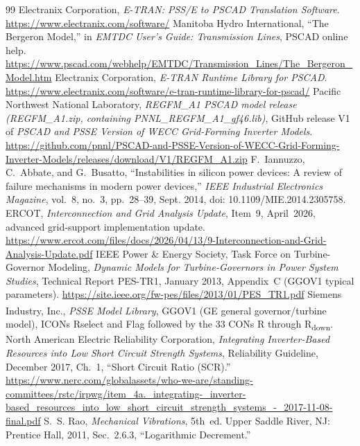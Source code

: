 \documentclass[11pt]{article}
\begin{document}
\begin{thebibliography}{99}
 Electranix Corporation, \emph{E-TRAN: PSS/E to PSCAD Translation Software}. \url{https://www.electranix.com/software/}
 Manitoba Hydro International, ``The Bergeron Model,'' in \emph{EMTDC User's Guide: Transmission Lines}, PSCAD online help. \url{https://www.pscad.com/webhelp/EMTDC/Transmission_Lines/The_Bergeron_Model.htm}
 Electranix Corporation, \emph{E-TRAN Runtime Library for PSCAD}. \url{https://www.electranix.com/software/e-tran-runtime-library-for-pscad/}
 Pacific Northwest National Laboratory, \emph{REGFM\_A1 PSCAD model release (REGFM\_A1.zip, containing PNNL\_REGFM\_A1\_gf46.lib)}, GitHub release V1 of \emph{PSCAD and PSSE Version of WECC Grid-Forming Inverter Models}. \url{https://github.com/pnnl/PSCAD-and-PSSE-Version-of-WECC-Grid-Forming-Inverter-Models/releases/download/V1/REGFM_A1.zip}
 F.~Iannuzzo, C.~Abbate, and G.~Busatto, ``Instabilities in silicon power devices: A review of failure mechanisms in modern power devices,'' \emph{IEEE Industrial Electronics Magazine}, vol.~8, no.~3, pp.~28--39, Sept. 2014, doi: 10.1109/MIE.2014.2305758.
 ERCOT, \emph{Interconnection and Grid Analysis Update}, Item~9, April~2026, advanced grid-support implementation update. \url{https://www.ercot.com/files/docs/2026/04/13/9-Interconnection-and-Grid-Analysis-Update.pdf}
 IEEE Power \& Energy Society, Task Force on Turbine-Governor Modeling, \emph{Dynamic Models for Turbine-Governors in Power System Studies}, Technical Report PES-TR1, January 2013, Appendix~C (GGOV1 typical parameters). \url{https://site.ieee.org/fw-pes/files/2013/01/PES_TR1.pdf}
 Siemens Industry, Inc., \emph{PSS\textsuperscript{\textregistered}E Model Library}, GGOV1 (GE general governor/turbine model), ICONs Rselect and Flag followed by the 33 CONs R through R\textsubscript{down}.
 North American Electric Reliability Corporation, \emph{Integrating Inverter-Based Resources into Low Short Circuit Strength Systems}, Reliability Guideline, December 2017, Ch.~1, ``Short Circuit Ratio (SCR).'' \url{https://www.nerc.com/globalassets/who-we-are/standing-committees/rstc/irpwg/item_4a._integrating-_inverter-based_resources_into_low_short_circuit_strength_systems_-_2017-11-08-final.pdf}
 S.~S. Rao, \emph{Mechanical Vibrations}, 5th~ed. Upper Saddle River, NJ: Prentice Hall, 2011, Sec.~2.6.3, ``Logarithmic Decrement.''
\end{thebibliography}
\end{document}
